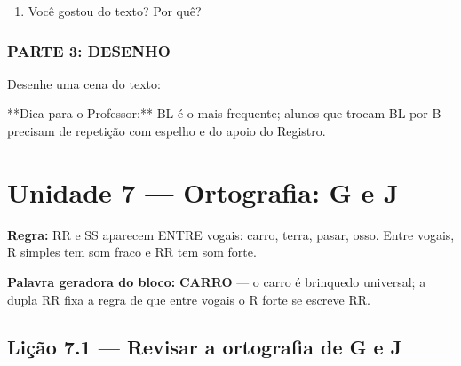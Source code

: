 \begin{exercicio}
\begin{enumerate}
  \item Você gostou do texto? Por quê?
  \begin{center}
  \underline{\hspace{12cm}}
  \end{center}

\end{enumerate}

\subsection*{PARTE 3: DESENHO}

Desenhe uma cena do texto:

\begin{center}
\end{center}

\end{exercicio}

\begin{dica}
**Dica para o Professor:** BL é o mais frequente; alunos que trocam BL por B precisam de repetição com espelho e do apoio do Registro.
\end{dica}


\chapter{Unidade 7 --- Ortografia: G e J}


\textbf{Regra:} RR e SS aparecem ENTRE vogais: carro, terra, pasar, osso. Entre vogais, R simples tem som fraco e RR tem som forte.

\textbf{Palavra geradora do bloco:} \textbf{CARRO} --- o carro é brinquedo universal; a dupla RR fixa a regra de que entre vogais o R forte se escreve RR.

\section{Lição 7.1 --- Revisar a ortografia de G e J}

